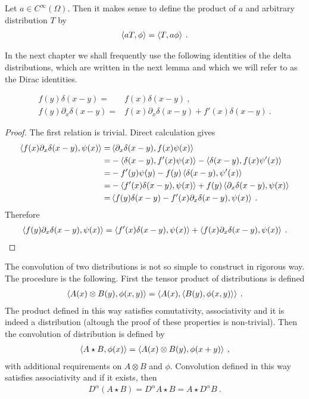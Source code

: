 Let $a \in C^\infty(\Omega)$. Then it makes sense to define the product of $a$ and arbitrary distribution $T$ by
\begin{align}
    \left \langle a T ,\phi \right \rangle = \left \langle T ,a \phi \right \rangle \:.
\end{align}

In the next chapter we shall frequently use the following identities of the delta distributions, which are written in the next lemma and which we will refer to as the Dirac identities.

\begin{lemma} \label{lemma:delta}
    \begin{align}
        f(y) \delta (x-y) =& f(x) \delta(x-y) \:, \\
        f(y) \partial_x \delta(x-y) =& f(x) \partial_x \delta(x-y) + f'(x) \delta(x-y) \:.
    \end{align}
\end{lemma}
\begin{proof}
    The first relation is trivial.
    Direct calculation gives
    \begin{align*}
        \left \langle f(x) \partial_x \delta(x-y) ,\psi(x) \right \rangle 
        =& \left \langle \partial_x \delta(x-y) ,f(x) \psi(x) \right \rangle 
         \\ =& -\left \langle \delta(x-y) ,f'(x)\psi(x) \right \rangle - \left \langle \delta(x-y) ,f(x)\psi'(x) \right \rangle 
         \\ =& -f'(y) \psi(y) - f(y) \left \langle \delta(x-y) ,\psi'(x) \right \rangle 
         \\ =& - \left \langle f'(x)  \delta(x-y) ,\psi(x) \right \rangle + f(y) \left \langle \partial_x \delta(x-y) ,\psi(x) \right \rangle 
         \\ =& \left \langle f(y) \delta(x-y) - f'(x) \partial_x \delta(x-y) ,\psi(x) \right \rangle \:.
    \end{align*}
    Therefore
    \begin{align}
        \left \langle f(y) \partial_x \delta(x-y) ,\psi(x) \right \rangle = \left \langle f'(x) \delta(x-y) ,\psi(x) \right \rangle + \left \langle f(x) \partial_x \delta(x-y) ,\psi(x) \right \rangle \:.
    \end{align} 
\end{proof}

The convolution of two distributions is not so simple to construct in rigorous way. The procedure is the following. First the tensor product of distributions is defined
\begin{align}
    \left \langle A(x) \otimes B(y) ,\phi(x,y) \right \rangle = \left \langle A(x) ,\left \langle B(y) ,\phi(x,y) \right \rangle \right \rangle \:.
\end{align}
The product defined in this way satisfies comutativity, associativity and it is indeed a distribution (altough the proof of these properties is non-trivial). Then the convolution of distribution is defined by
\begin{align}
    \left \langle A \star B ,\phi(x) \right \rangle = \left \langle A(x) \otimes B(y) ,\phi(x+y) \right \rangle \:,
\end{align}
with additional requirements on $A \otimes B$ and $\phi$. Convolution defined in this way satisfies associativity and if it exists, then
\begin{align}
    D^\alpha (A \star B) = D^\alpha A \star B = A \star D^\alpha B \:.
\end{align}

